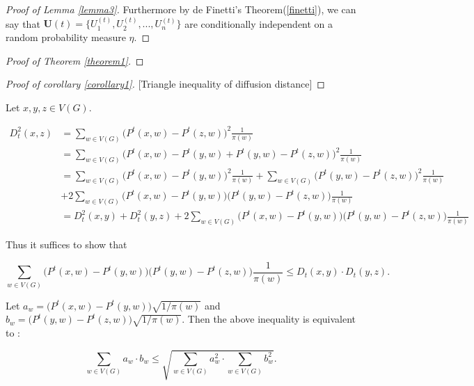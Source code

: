 \documentclass[12pt]{article}
\theoremstyle{definition}
\begin{document}
\begin{proof}[Proof of Lemma \ref{lemma3}]
Furthermore by de Finetti's Theorem(\ref{finetti}), we can say that $\mathbf{U}(t) = \{ U^{(t)}_{1}, U^{(t)}_{2}, ... , U^{(t)}_{n} \}$ are conditionally independent on a random probability measure $\eta$. 
\end{proof}


\begin{proof}[Proof of Theorem \ref{theorem1}]
\end{proof}


\begin{proof}[Proof of corollary \ref{corollary1}][Triangle inequality of diffusion distance]
\end{proof}

Let $x, y, z \in V(G).$

\begin{equation}
\begin{split}
 D^{2}_{t}(x,z) & = \sum\limits_{w \in V(G)} \big( P^{t}(x,w) - P^{t}(z,w)   \big)^2 \frac{1}{\pi(w)}  \\ & = \sum\limits_{w \in V(G)} \big(P^{t}(x, w) - P^{t}(y,w) + P^{t}(y,w) - P^{t}(z,w) \big)^2 \frac{1}{\pi(w)} \\ & = \sum\limits_{w \in V(G)} \big( P^{t}(x,w) - P^{t}(y,w) \big)^2 \frac{1}{\pi(w)}  + \sum\limits_{w \in V(G)} \big( P^{t}(y,w) - P^{t}(z,w)  \big)^2 \frac{1}{\pi(w)} \\ & + 2 \sum\limits_{w \in V(G)} \big( P^{t}(x,w) - P^{t}(y,w)  \big) \big( P^{t}(y,w) - P^{t}(z,w)  \big)\frac{1}{\pi(w)} \\ &= D^{2}_{t}(x,y) + D^{2}_{t}(y,z) +  2 \sum\limits_{w \in V(G)} \big( P^{t}(x,w) - P^{t}(y,w)  \big) \big( P^{t}(y,w) - P^{t}(z,w)  \big)\frac{1}{\pi(w)}   
\end{split}
\end{equation}


Thus it suffices to show that 

\begin{equation}
\sum\limits_{w \in V(G)} \big( P^{t}(x,w) - P^{t}(y,w)  \big) \big( P^{t}(y,w) - P^{t}(z,w)  \big)\frac{1}{\pi(w)} \leq D_{t}(x,y) \cdot D_{t}(y,z). 
\end{equation}

Let $a_{w} = \big(P^{t}(x,w) - P^{t}(y,w) \big) \sqrt{1 / \pi(w)}$ and $b_{w} = \big( P^{t}(y,w) - P^{t}(z,w) \big) \sqrt{1 / \pi(w)}$. Then the above inequality is equivalent to :

\begin{equation} 
\sum\limits_{w \in V(G)} a_{w} \cdot b_{w} \leq \sqrt{\sum\limits_{w \in V(G)} a^2_{w} \cdot \sum\limits_{w \in V(G)} b^2_{w} }.
\end{equation}
\end{document}
